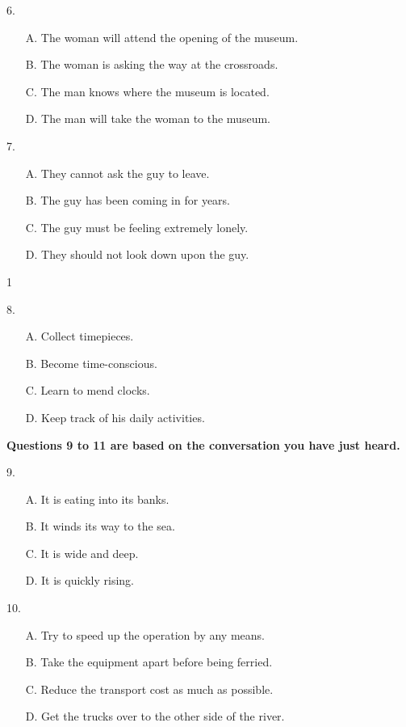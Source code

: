 \documentclass[UTF8,11pt]{ctexart}
\begin{document}
6.


\begin{itemize}[leftmargin=2em,itemsep=.2em,topsep=.4em]\item[A.] The woman will attend the opening of the museum.
\item[B.] The woman is asking the way at the crossroads.
\item[C.] The man knows where the museum is located.
\item[D.] The man will take the woman to the museum.
\end{itemize}

7.


\begin{itemize}[leftmargin=2em,itemsep=.2em,topsep=.4em]\item[A.] They cannot ask the guy to leave.
\item[B.] The guy has been coming in for years.
\item[C.] The guy must be feeling extremely lonely.
\item[D.] They should not look down upon the guy.
\end{itemize}

1


8.


\begin{itemize}[leftmargin=2em,itemsep=.2em,topsep=.4em]\item[A.] Collect timepieces.
\item[B.] Become time-conscious.
\item[C.] Learn to mend clocks.
\item[D.] Keep track of his daily activities.
\end{itemize}

\textbf{Questions 9 to 11 are based on the conversation you have just heard.}


9.


\begin{itemize}[leftmargin=2em,itemsep=.2em,topsep=.4em]\item[A.] It is eating into its banks.
\item[B.] It winds its way to the sea.
\item[C.] It is wide and deep.
\item[D.] It is quickly rising.
\end{itemize}

10.


\begin{itemize}[leftmargin=2em,itemsep=.2em,topsep=.4em]\item[A.] Try to speed up the operation by any means.
\item[B.] Take the equipment apart before being ferried.
\item[C.] Reduce the transport cost as much as possible.
\item[D.] Get the trucks over to the other side of the river.
\end{itemize}
\end{document}
